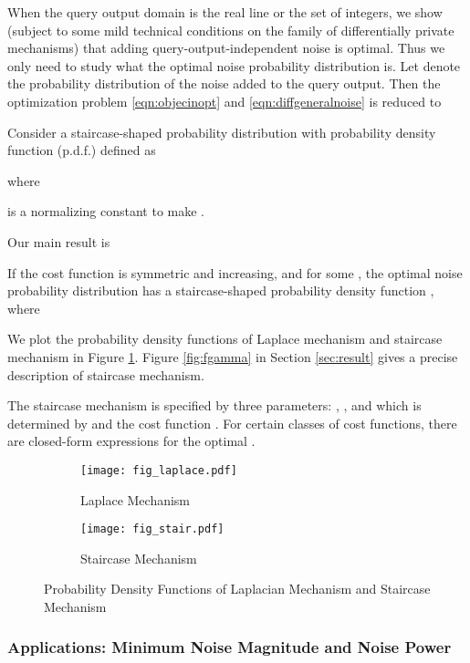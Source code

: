 When the query output domain is the real line or the set of integers, we show (subject to some mild technical conditions on the family of differentially private mechanisms) that adding query-output-independent noise is optimal. Thus we only need to study what  the optimal noise probability distribution is. Let  denote the probability distribution of the noise added to the query output. Then the optimization problem \eqref{eqn:objecinopt} and \eqref{eqn:diffgeneralnoise} is reduced to




Consider a staircase-shaped probability distribution with probability density function (p.d.f.)  defined as

where

is a normalizing constant to make .


Our main result is
\begin{theorem}
	If the cost function  is symmetric and increasing, and  for some , the optimal noise probability distribution has a staircase-shaped probability density function , where
	
	
\end{theorem}

We plot the probability density functions of Laplace mechanism and staircase mechanism in Figure \ref{fig:probdf}. Figure \ref{fig:fgamma} in Section \ref{sec:result} gives a precise description of staircase mechanism.

The staircase mechanism is specified by three parameters: , , and  which is determined by  and the cost function . For certain classes of cost functions, there are closed-form expressions for the optimal .



\begin{figure}[h]
\begin{subfigure}[b]{0.5\linewidth}
\centering
\texttt{[image: fig\_laplace.pdf]}
\caption{ Laplace Mechanism }
\end{subfigure}
\begin{subfigure}[b]{0.5\linewidth}
\centering
\texttt{[image: fig\_stair.pdf]}
\caption{ Staircase Mechanism}
\end{subfigure}
\caption{Probability Density Functions of Laplacian Mechanism and Staircase Mechanism}
\label{fig:probdf}
\end{figure}



\subsubsection{Applications: Minimum Noise Magnitude and Noise Power}

